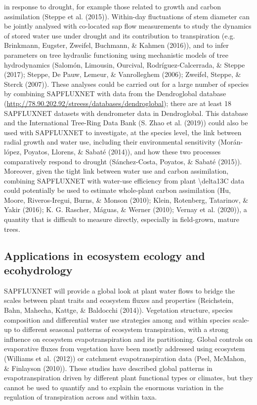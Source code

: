 \documentclass[11pt,twoside]{reedthesis}
\begin{document}
in response to drought, for example those related to growth and carbon
assimilation (Steppe et al. (2015)). Within-day fluctuations of stem
diameter can be jointly analysed with co-located sap flow measurements
to study the dynamics of stored water use under drought and its
contribution to transpiration (e.g. Brinkmann, Eugster, Zweifel,
Buchmann, \& Kahmen (2016)), and to infer parameters on tree hydraulic
functioning using mechanistic models of tree hydrodynamics (Salomón,
Limousin, Ourcival, Rodríguez-Calcerrada, \& Steppe (2017); Steppe, De
Pauw, Lemeur, \& Vanrolleghem (2006); Zweifel, Steppe, \& Sterck
(2007)). These analyses could be carried out for a large number of
species by combining SAPFLUXNET with data from the Dendroglobal database
(\url{http://78.90.202.92/streess/databases/dendroglobal}); there are at
least 18 SAPFLUXNET datasets with dendrometer data in Dendroglobal. This
database and the International Tree-Ring Data Bank (S. Zhao et al.
(2019)) could also be used with SAPFLUXNET to investigate, at the
species level, the link between radial growth and water use, including
their environmental sensitivity (Morán-lópez, Poyatos, Llorens, \&
Sabaté (2014)), and how these two processes comparatively respond to
drought (Sánchez-Costa, Poyatos, \& Sabaté (2015)). Moreover, given the
tight link between water use and carbon assimilation, combining
SAPFLUXNET with water-use efficiency from plant \textbackslash{}delta13C
data could potentially be used to estimate whole-plant carbon
assimilation (Hu, Moore, Riveros-Iregui, Burns, \& Monson (2010); Klein,
Rotenberg, Tatarinov, \& Yakir (2016); K. G. Rascher, Máguas, \& Werner
(2010); Vernay et al. (2020)), a quantity that is difficult to measure
directly, especially in field-grown, mature trees.\par

\subsection{Applications in ecosystem ecology and
ecohydrology}\label{applications-in-ecosystem-ecology-and-ecohydrology}

SAPFLUXNET will provide a global look at plant water flows to bridge the
scales between plant traits and ecosystem fluxes and properties
(Reichstein, Bahn, Mahecha, Kattge, \& Baldocchi (2014)). Vegetation
structure, species composition and differential water use strategies
among and within species scale-up to different seasonal patterns of
ecosystem transpiration, with a strong influence on ecosystem
evapotranspiration and its partitioning. Global controls on evaporative
fluxes from vegetation have been mostly addressed using ecosystem
(Williams et al. (2012)) or catchment evapotranspiration data (Peel,
McMahon, \& Finlayson (2010)). These studies have described global
patterns in evapotranspiration driven by different plant functional
types or climates, but they cannot be used to quantify and to explain
the enormous variation in the regulation of transpiration across and
within taxa.\par
\end{document}
